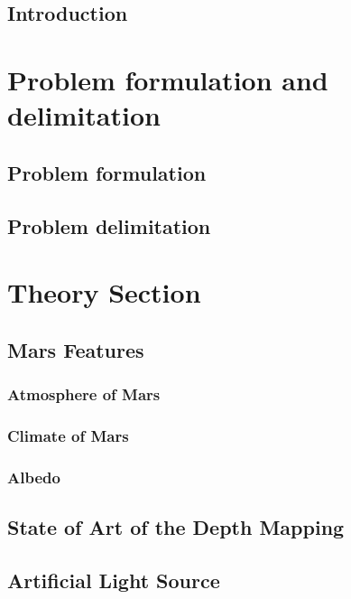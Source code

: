 \documentclass[12pt,a4paper,fleqn, onesside]{report}
\begin{document}
\pagebreak
{}
\setcounter{page}{1}
\setcounter{tocdepth}{4}
\setcounter{secnumdepth}{4} 
\def\chaptername{Part}

\tableofcontents
\newpage
{}

\section*{Introduction}


\chapter{Problem formulation and delimitation}
\section{Problem formulation}


\section{Problem delimitation}


\chapter{Theory Section}
\section{Mars Features}

\subsection{Atmosphere of Mars}

\subsection{Climate of Mars}

\subsection{Albedo}

\section{State of Art of the Depth Mapping}


\section{Artificial Light Source}

\end{document}
